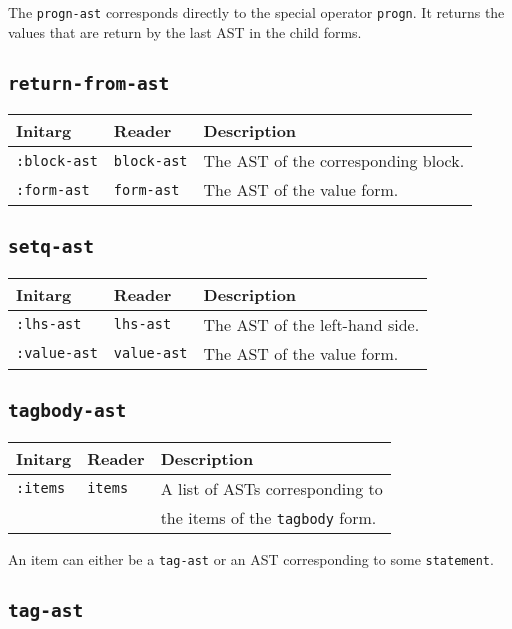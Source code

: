 The \texttt{progn-ast} corresponds directly to the \cl{} special
operator \texttt{progn}.  It returns the values that are return by the
last AST in the child forms.

\subsection{\texttt{return-from-ast}}
\label{return-from-ast}

\begin{tabular}{|l|l|l|}
\hline
Initarg & Reader & Description\\
\hline\hline
\texttt{:block-ast} & \texttt{block-ast} & The AST of the
corresponding block.\\
\hline
\texttt{:form-ast} & \texttt{form-ast} & The AST of the value form.\\
\hline
\end{tabular}

\subsection{\texttt{setq-ast}}
\label{setq-ast}

\begin{tabular}{|l|l|l|}
\hline
Initarg & Reader & Description\\
\hline\hline
\texttt{:lhs-ast} & \texttt{lhs-ast} & The AST of the left-hand side.\\
\hline
\texttt{:value-ast} & \texttt{value-ast} & The AST of the value form.\\
\hline
\end{tabular}


\subsection{\texttt{tagbody-ast}}
\label{tagbody-ast}

\begin{tabular}{|l|l|l|}
\hline
Initarg & Reader & Description\\
\hline\hline
\texttt{:items} & \texttt{items} & A list of ASTs corresponding to\\
& & the items of the \texttt{tagbody} form. \\
\hline
\end{tabular}

An item can either be a \texttt{tag-ast} or an AST corresponding to
some \texttt{statement}. 

\subsection{\texttt{tag-ast}}
\label{tag-ast}

